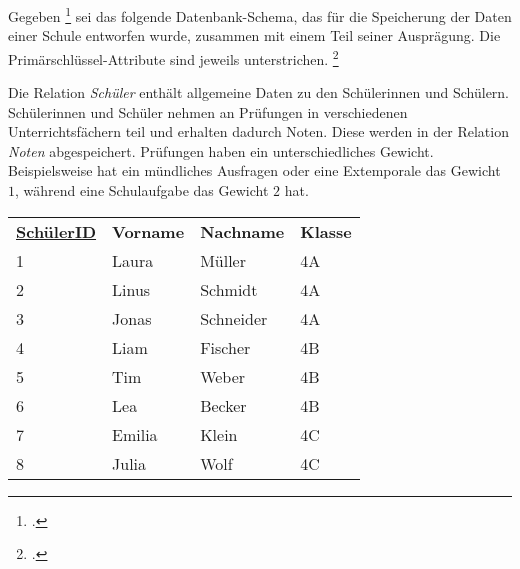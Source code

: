 \documentclass{bschlangaul-aufgabe}
\begin{document}

\let\f=\textbf
\let\u=\underline
\let\s=\bSqlCode

Gegeben \footcite{examen:46116:2018:09} sei das folgende
Datenbank-Schema, das für die Speicherung der Daten einer Schule
entworfen wurde, zusammen mit einem Teil seiner Ausprägung. Die
Primärschlüssel-Attribute sind jeweils unterstrichen.
\footcite{db:ab:3}

Die Relation \emph{Schüler} enthält allgemeine Daten zu den Schülerinnen
und Schülern. Schülerinnen und Schüler nehmen an Prüfungen in
verschiedenen Unterrichtsfächern teil und erhalten dadurch Noten. Diese
werden in der Relation \emph{Noten} abgespeichert. Prüfungen haben ein
unterschiedliches Gewicht. Beispielsweise hat ein mündliches Ausfragen
oder eine Extemporale das Gewicht $1$, während eine Schulaufgabe das
Gewicht $2$ hat.


\begin{center}
\begin{tabular}{|llll|}
\hline
\f{\u{SchülerID}} & \f{Vorname} & \f{Nachname}  & \f{Klasse} \\
1                 & Laura       & Müller        & 4A         \\
2                 & Linus       & Schmidt       & 4A         \\
3                 & Jonas       & Schneider     & 4A         \\
4                 & Liam        & Fischer       & 4B         \\
5                 & Tim         & Weber         & 4B         \\
6                 & Lea         & Becker        & 4B         \\
7                 & Emilia      & Klein         & 4C         \\
8                 & Julia       & Wolf          & 4C         \\
\hline
\end{tabular}
\end{center}
\end{document}
